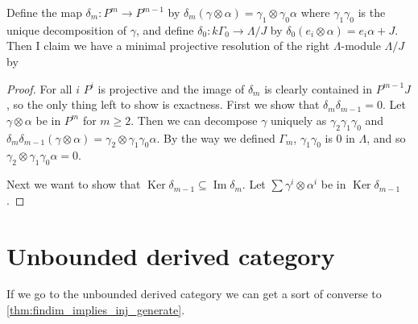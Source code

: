 \documentclass[11pt, a4paper, english]{article}
\theoremstyle{definition}
\DeclareMathOperator{\Image}{Im}
\DeclareMathOperator{\Ker}{Ker}
\begin{document}
Define the map $\delta_m : P^m \to P^{m-1}$ by $\delta_m(\gamma \otimes \alpha) = \gamma_1 \otimes \gamma_0\alpha$ where $\gamma_1\gamma_0$ is the unique decomposition of $\gamma$, and define $\delta_0:k\Gamma_0 \to \Lambda /J$ by $\delta_0(e_i\otimes \alpha) = e_i\alpha + J$. Then I claim we have a minimal projective resolution of the right $\Lambda$-module $\Lambda/J$ by

\begin{center}
\end{center}

\begin{proof}
	For all $i$ $P^i$ is projective and the image of $\delta_m$ is clearly contained in $P^{m-1}J$, so the only thing left to show is exactness. First we show that $\delta_m\delta_{m-1}=0$. Let $\gamma\otimes \alpha$ be in $P^m$ for $m \geq 2$. Then we can decompose $\gamma$ uniquely as $\gamma_2\gamma_1\gamma_0$ and $\delta_m\delta_{m-1}(\gamma\otimes \alpha) = \gamma_2\otimes\gamma_1\gamma_0\alpha$. By the way we defined $\Gamma_m$, $\gamma_1\gamma_0$ is 0 in $\Lambda$, and so $\gamma_2\otimes\gamma_1\gamma_0\alpha = 0$.
	
	Next we want to show that $\Ker\delta_{m-1} \subseteq \Image\delta_m$. Let $\sum \gamma^i\otimes \alpha^i$ be in $\Ker\delta_{m-1}$. 
\end{proof}

\section{Unbounded derived category}

If we go to the unbounded derived category we can get a sort of converse to \cref{thm:findim_implies_inj_generate}.
\end{document}
